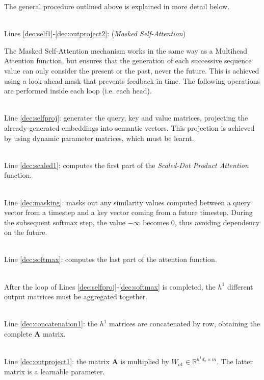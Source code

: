 \documentclass[algorithms,article,submit,pdftex,moreauthors]{Definitions/mdpi}
\begin{document}

The general procedure outlined above is explained in more detail below.

~\\Lines \ref{dec:self1}-\ref{dec:outproject2}: (\textit{Masked Self-Attention})

The Masked Self-Attention mechanism works in the same way as a Multihead Attention function, but ensures that the generation of each successive sequence value can only consider the present or the past, never the future. This is achieved using a look-ahead mask that prevents feedback in time.
The following operations are performed inside each loop (i.e. each head).

~\\Line \ref{dec:selfproj}: generates the query, key and value matrices, projecting the already-generated embeddings into semantic vectors. This projection is achieved by using dynamic parameter matrices, which must be learnt.

~\\Line \ref{dec:scaled1}: computes the first part of the \textit{Scaled-Dot Product Attention} function.

~\\Line \ref{dec:masking}: masks out any similarity values computed between a query vector from a timestep and a key vector coming from a future timestep. During the subsequent softmax step, the value $-\infty$ becomes 0, thus avoiding dependency on the future.

~\\Line \ref{dec:softmax}: computes the last part of the attention function.

~\\After the loop of Lines \ref{dec:selfproj}-\ref{dec:softmax} is completed, the $h^1$ different output matrices must be aggregated together.

~\\Line \ref{dec:concatenation1}: the $h^1$ matrices are concatenated by row, obtaining the complete \textbf{A} matrix.

~\\Line \ref{dec:outproject1}: the matrix \textbf{A} is multiplied by $W_{o1} \in \mathbb{R}^{h^1d_v \times m}$. The latter matrix is a learnable parameter.
\end{document}
